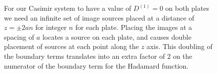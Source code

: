 \documentclass{article}
\begin{document}
\begin{figure}[h]
    \centering
    
    \caption{For our Casimir system to have a value of \( D^{(1)} = 0 \) on both plates we need an infinite set of image sources placed at a distance of \( z = \pm 2an \) for integer \( n \) for each plate. Placing the images at a spacing of \( a \) locates a source on each plate, and causes double placement of sources at each point along the \( z \) axis. This doubling of the boundary terms translates into an extra factor of \( 2 \) on the numerator of the boundary term for the Hadamard function.}
    \label{fig:casimir_system}
\end{figure}
\end{document}
